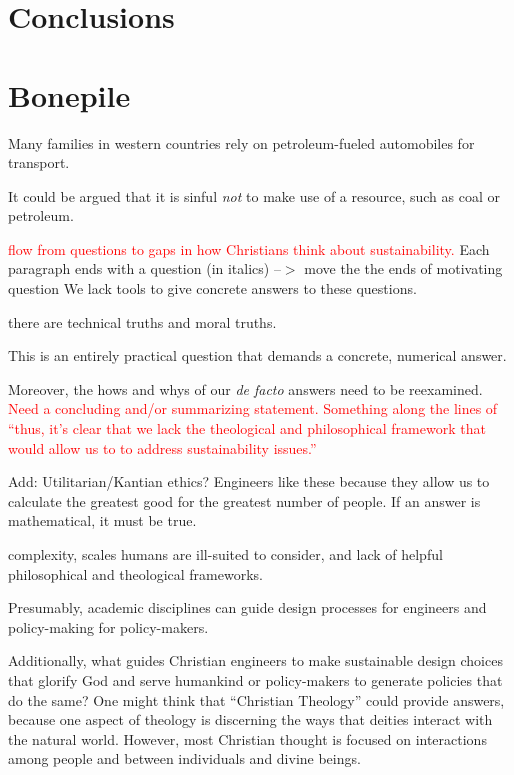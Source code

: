 \documentclass[12pt]{article}
\newcommand{\ins}[1]{\textcolor{red}{#1}}
\begin{document}
\section{Conclusions}
\label{sec:conclusions}



\section{Bonepile}


Many families in western countries rely on petroleum-fueled automobiles for transport.

It could be argued that it is sinful \emph{not} to make use of a resource, such as coal or petroleum. 

\ins{flow from questions to gaps in how Christians think about sustainability.}
Each paragraph ends with a question (in italics)
--$>$ move the the ends of motivating question
 We lack tools to give concrete answers to these questions.

there are technical truths and moral truths. 

This is an entirely practical question that demands a concrete, numerical answer.

Moreover, the hows and whys of our \emph{de facto} answers need to be reexamined.
\ins{Need a concluding and/or summarizing statement. Something along the lines of ``thus, it's clear that we lack the theological
and philosophical framework that would allow us to to address sustainability issues.''}

Add: Utilitarian/Kantian ethics? Engineers like these because they allow us to calculate the greatest good for the greatest number of people.
If an answer is mathematical, it must be true.


complexity, scales humans are ill-suited to consider, 
and lack of helpful philosophical and theological frameworks.

Presumably, academic disciplines can guide design processes for engineers
and policy-making for policy-makers.




Additionally, what guides Christian engineers to make sustainable design choices
that glorify God and serve humankind
or policy-makers to generate policies that do the same?
One might think that ``Christian Theology'' could provide answers, because
one aspect of theology is discerning the 
ways that deities interact with the natural world. 
However, most Christian thought is focused on interactions among people 
and between individuals and divine beings.
\end{document}
